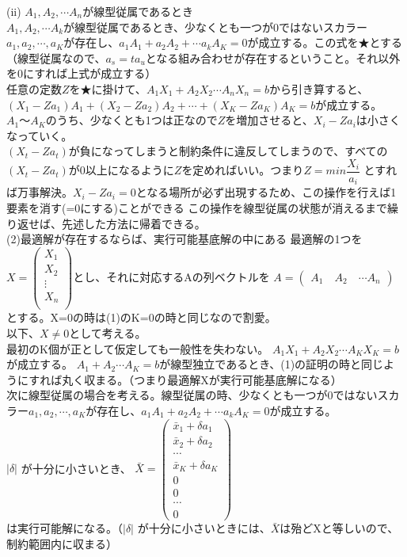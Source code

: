 \documentclass[platex,dvipdfmx]{jlreq}			%
\begin{document}
(ii) $A_1,A_2, \cdots A_n$が線型従属であるとき\\
$A_1,A_2, \cdots A_k$が線型従属であるとき、少なくとも一つが0ではないスカラー$a_1,a_2, \cdots , a_K$が存在し、$a_1 A_1 + a_2 A_2 + \cdots a_k A_K=0$が成立する。この式を★とする\\
（線型従属なので、$a_s = t a_u$となる組み合わせが存在するということ。それ以外を0にすれば上式が成立する）\\
任意の定数$Z$を★に掛けて、$A_1 X_1 + A_2 X_2 \cdots A_n X_n = b$から引き算すると、\\
$(X_1 - Z a_1)A_1 + (X_2 - Z a_2)A_2 + \cdots + (X_K - Z a_K)A_K = b$が成立する。$A_1～A_K$のうち、少なくとも1つは正なので$Z$を増加させると、$X_i -Z a_i$は小さくなっていく。\\
$(X_t - Z a_t)$が負になってしまうと制約条件に違反してしまうので、すべての$(X_t - Z a_t)$が0以上になるように$Z$を定めればいい。つまり$Z = min \dfrac{X_i}{a_i}$ とすれば万事解決。$X_i - Z a_i=0$となる場所が必ず出現するため、この操作を行えば1要素を消す(=0にする)ことができる
この操作を線型従属の状態が消えるまで繰り返せば、先述した方法に帰着できる。\\
(2)最適解が存在するならば、実行可能基底解の中にある
最適解の1つを
$X= \begin{pmatrix}
X_1 \\
X_2 \\
\vdots\\
X_n \\
\end{pmatrix}
$とし、それに対応するAの列ベクトルを
$A= \begin{pmatrix}
A_1 \quad A_2 \quad \cdots A_n
\end{pmatrix}
$
とする。X=0の時は(1)のK=0の時と同じなので割愛。\\
以下、$X \neq 0$として考える。\\
最初のK個が正として仮定しても一般性を失わない。
$A_1 X_1 + A_2 X_2 \cdots A_K X_K = b$が成立する。
$A_1 + A_2 \cdots A_K = b$が線型独立であるとき、(1)の証明の時と同じようにすれば丸く収まる。（つまり最適解Xが実行可能基底解になる）\\
次に線型従属の場合を考える。線型従属の時、少なくとも一つが0ではないスカラー$a_1,a_2, \cdots , a_K$が存在し、$a_1 A_1 + a_2 A_2 + \cdots a_k A_K=0$が成立する。\\
$|\delta|$ が十分に小さいとき、
$\bar{X}= \begin{pmatrix}
\bar{x}_1 + \delta a_1 \\
\bar{x}_2 + \delta a_2 \\
\cdots \\
\bar{x}_K + \delta a_K\\
0 \\
0 \\
\cdots \\
0
\end{pmatrix}
$\\
は実行可能解になる。（$|\delta|$ が十分に小さいときには、$\bar{X}$は殆どXと等しいので、制約範囲内に収まる）\\
\end{document}
